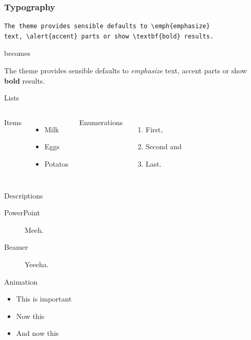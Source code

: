 \documentclass[10pt, compress]{beamer}
\begin{document}
\begin{frame}[fragile]
  \frametitle{Typography}
      \begin{verbatim}
The theme provides sensible defaults to \emph{emphasize}
text, \alert{accent} parts or show \textbf{bold} results.
      \end{verbatim}

  \begin{center}becomes\end{center}

  The theme provides sensible defaults to \emph{emphasize} text,
  \alert{accent} parts or show \textbf{bold} results.
\end{frame}
\begin{frame}{Lists}
  \begin{columns}[onlytextwidth]
      Items
      \begin{itemize}
        \item Milk \item Eggs \item Potatos
      \end{itemize}

      Enumerations
      \begin{enumerate}
        \item First, \item Second and \item Last.
      \end{enumerate}
  \end{columns}
\end{frame}
\begin{frame}{Descriptions}
  \begin{description}
    \item[PowerPoint] Meeh.
    \item[Beamer] Yeeeha.
  \end{description}
\end{frame}
\begin{frame}{Animation}
  \begin{itemize}[<+- | alert@+>]
    \item \alert<4>{This is important}
    \item Now this
    \item And now this
  \end{itemize}
\end{frame}
\end{document}
